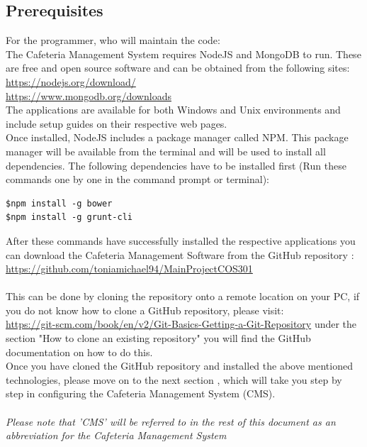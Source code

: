 \documentclass[a4paper,12pt]{article}
\begin{document}
\subsection{Prerequisites}
For the programmer, who will maintain the code: \\
The Cafeteria Management System requires NodeJS and MongoDB to run. These are free and open source software and can be obtained from the following sites:\\
\url{https://nodejs.org/download/} \\
\url{https://www.mongodb.org/downloads} \\
The applications are available for both Windows and Unix environments and include setup guides on their respective web pages.\\

Once installed, NodeJS includes a package manager called NPM. This package manager will be available from the terminal and will be used to install all dependencies. The following dependencies have to be installed first (Run these commands one by one in the command prompt or terminal):
\begin{verbatim}
$npm install -g bower
$npm install -g grunt-cli
\end{verbatim}

After these commands have successfully installed the respective applications you can download the Cafeteria Management Software from the GitHub repository :
 \url{https://github.com/toniamichael94/MainProjectCOS301}
\\ \\
This can be done by cloning the repository onto a remote location on your PC, if you do not know how to clone a GitHub repository, please visit:\\
  \url{https://git-scm.com/book/en/v2/Git-Basics-Getting-a-Git-Repository}  under the section "How to clone an existing repository" you will find the GitHub documentation on how to do this.
\\
Once you have cloned the GitHub repository and installed the above mentioned technologies, please move on to the next section , which will take you step by step in configuring the Cafeteria Management System (CMS).
\\ \\
{\em Please note that 'CMS' will be referred to in the rest of this document as an abbreviation for the Cafeteria Management System}


\end{document}
